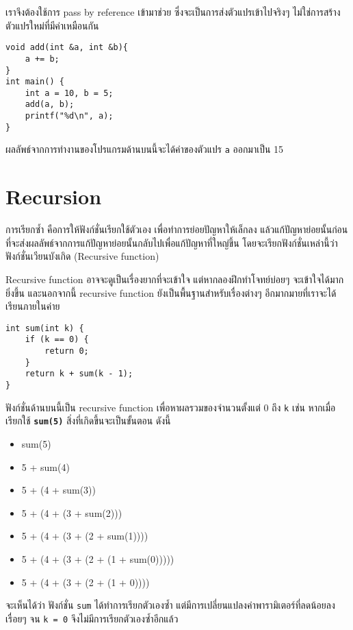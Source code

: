 เราจึงต้องใช้การ pass by reference เข้ามาช่วย ซึ่งจะเป็นการส่งตัวแปรเข้าไปจริงๆ ไม่ใช่การสร้างตัวแปรใหม่ที่มีค่าเหมือนกัน
\begin{lstlisting}
void add(int &a, int &b){
	a += b;
}
int main() {
	int a = 10, b = 5;
    add(a, b);
    printf("%d\n", a);
}
\end{lstlisting}
ผลลัพธ์จากการทำงานของโปรแกรมด้านบนนี้จะได้ค่าของตัวแปร \texttt{a} ออกมาเป็น 15

\section{Recursion}
การเรียกซ้ำ คือการให้ฟังก์ชั่นเรียกใช้ตัวเอง เพื่อทำการย่อยปัญหาให้เล็กลง แล้วแก้ปัญหาย่อยนั้นก่อนที่จะส่งผลลัพธ์จากการแก้ปัญหาย่อยนั้นกลับไปเพื่อแก้ปัญหาที่ใหญ่ขึ้น โดยจะเรียกฟังก์ชั่นเหล่านี้ว่า ฟังก์ชั่นเวียนบังเกิด (Recursive function)

Recursive function อาจจะดูเป็นเรื่องยากที่จะเข้าใจ แต่หากลองฝึกทำโจทย์บ่อยๆ จะเข้าใจได้มากยิ่งขึ้น และนอกจากนี้ recursive function ยังเป็นพื้นฐานสำหรับเรื่องต่างๆ อีกมากมายที่เราจะได้เรียนภายในค่าย
\begin{lstlisting}
int sum(int k) {
	if (k == 0) {
    	return 0;
    }
    return k + sum(k - 1);
}
\end{lstlisting}
ฟังก์ชั่นด้านบนนี้เป็น recursive function เพื่อหาผลรวมของจำนวนตั้งแต่ 0 ถึง \texttt{k} เช่น หากเมื่อเรียกใช้ \textbf{\texttt{sum(5)}} สิ่งที่เกิดขึ้นจะเป็นขั้นตอน ดังนี้
\begin{itemize}
\item sum(5)
\item 5 + sum(4)
\item 5 + (4 + sum(3))
\item 5 + (4 + (3 + sum(2)))
\item 5 + (4 + (3 + (2 + sum(1))))
\item 5 + (4 + (3 + (2 + (1 + sum(0)))))
\item 5 + (4 + (3 + (2 + (1 + 0))))
\end{itemize}
จะเห็นได้ว่า ฟังก์ชั่น \texttt{sum} ได้ทำการเรียกตัวเองซ้ำ แต่มีการเปลี่ยนแปลงค่าพารามิเตอร์ที่ลดน้อยลงเรื่อยๆ จน \texttt{k = 0} จึงไม่มีการเรียกตัวเองซ้ำอีกแล้ว

